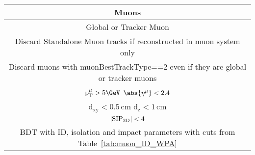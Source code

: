 \begin{table}[H]
\begin{tabular}{|c|c|}
                \hline \hline
		\multicolumn{2}{|c|}{\textbf{Muons}}  \\ \hline
                \multicolumn{2}{|c|}{Global or Tracker Muon} \\
                \multicolumn{2}{|c|}{Discard Standalone Muon tracks if reconstructed in muon system only} \\
                \multicolumn{2}{|c|}{Discard muons with muonBestTrackType==2 even if they are global or tracker muons} \\
		\multicolumn{2}{|c|}{$\mathrm{p_T^{\mu}} > 5 \GeV$ \hspace{0.5cm} $\abs{\eta^{\mu}} < 2.4$}                                                                                                                                       \\
		\multicolumn{2}{|c|}{$\mathrm{d_{xy}} < 0.5 \, \mathrm{cm}$ \hspace{0.5cm} $\mathrm{d_{z}} < 1 \, \mathrm{cm}$}                                                                                                                           \\
		\multicolumn{2}{|c|}{$| {\rm SIP_{3D}} | < 4$  }                                                                                                                                                                                   \\
                \multicolumn{2}{|c|}{BDT with ID, isolation and impact parameters with cuts from Table~\ref{tab:muon_ID_WPA}  }    \\ 

\end{tabular}
\end{table}
